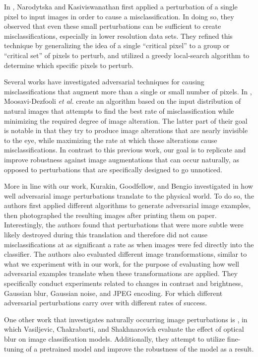 \documentclass[conference]{IEEEtran}
\begin{document}
In \cite{simpleblackboxpert}, Narodytska and Kasiviswanathan first applied a perturbation of a single pixel to input images in order to cause a misclassification. In doing so, they observed that even these small perturbations can be sufficient to create misclassifications, especially in lower resolution data sets. They refined this technique by generalizing the idea of a single “critical pixel” to a group or “critical set” of pixels to perturb, and utilized a greedy local-search algorithm to determine which specific pixels to perturb.

Several works have investigated adversarial techniques for causing misclassifications that augment more than a single or small number of pixels. In \cite{universaladvpert}, Moosavi-Dezfooli {\it et al.} create an algorithm based on the input distribution of natural images that attempts to find the best rate of misclassification while minimizing the required degree of image alteration. The latter part of their goal is notable in that they try to produce image alterations that are nearly invisible to the eye, while maximizing the rate at which those alterations cause misclassifications. In contrast to this previous work, our goal is to replicate and improve robustness against image augmentations that can occur naturally, as opposed to perturbations that are specifically designed to go unnoticed.

More in line with our work, Kurakin, Goodfellow, and Bengio investigated in \cite{adversarialexamplesworld} how well adversarial image perturbations translate to the physical world. To do so, the authors first applied different algorithms to generate adversarial image examples, then photographed the resulting images after printing them on paper. Interestingly, the authors found that perturbations that were more subtle were likely destroyed during this translation and therefore did not cause misclassifications at as significant a rate as when images were fed directly into the classifier. The authors also evaluated different image transformations, similar to what we experiment with in our work, for the purpose of evaluating how well adversarial examples translate when these transformations are applied. They specifically conduct experiments related to changes in contrast and brightness, Gaussian blur, Gaussian noise, and JPEG encoding. For which different adversarial perturbations carry over with different rates of success.

One other work that investigates naturally occurring image perturbations is \cite{cnnblur}, in which Vasiljevic, Chakrabarti, and Shakhnarovich evaluate the effect of optical blur on image classification models. Additionally, they attempt to utilize fine-tuning of a pretrained model and improve the robustness of the model as a result.
\end{document}

